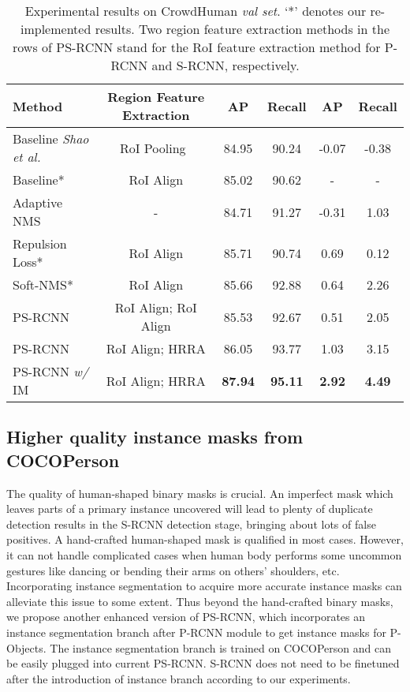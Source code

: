 \documentclass{article}
\begin{document}
\begin{table*}[!t]
\centering
\caption{
Experimental results on CrowdHuman \textit{val set}. `*' denotes our re-implemented results.
Two region feature extraction methods in the rows of PS-RCNN stand for the RoI feature extraction method for P-RCNN and S-RCNN, respectively.}
\begin{tabular}{l|c|cc|cc}
\hline
Method         & Region Feature Extraction & AP    & Recall &  AP &  Recall \\ \hline
Baseline \emph{Shao et al.~\cite{CrowdHuman}}         &           RoI Pooling~\cite{Ren2017Faster}  &   84.95    & 90.24       &  -0.07  &  -0.38      \\
Baseline*      &           RoI Align               &    85.02   &  90.62      &  -  & -       \\
Adaptive NMS~\cite{Liu2019Adaptive}   &            -               & 84.71 & 91.27  &  -0.31   & 1.03    \\
Repulsion Loss*~\cite{Repulsionloss}  &           RoI Align               &   85.71    &  90.74      & 0.69   & 0.12       \\
Soft-NMS*~\cite{softnms}  &           RoI Align               &   85.66    &  92.88      & 0.64   & 2.26       \\ \hline
PS-RCNN        &           RoI Align; RoI Align                &  85.53     &  92.67      & 0.51   & 2.05       \\
PS-RCNN        &           RoI Align; HRRA          &  86.05     &  93.77      & 1.03   & 3.15       \\
PS-RCNN \textit{w/} IM   &           RoI Align; HRRA               &   \textbf{87.94}    &   \textbf{95.11}   &  \textbf{2.92}   & \textbf{4.49}      
\end{tabular}\label{mainresults}
\vspace{-0.4cm}
\end{table*}


\subsection{Higher quality instance masks from COCOPerson}

The quality of human-shaped binary masks is crucial. An imperfect mask which leaves parts of a primary instance uncovered will lead to plenty of duplicate detection results in the S-RCNN detection stage, bringing about lots of false positives. A hand-crafted human-shaped mask is qualified in most cases. However, it can not handle complicated cases when human body performs some uncommon gestures like dancing or bending their arms on others' shoulders, etc. Incorporating instance segmentation to acquire more accurate instance masks can alleviate this issue to some extent. Thus beyond the hand-crafted binary masks, we propose another enhanced version of PS-RCNN, which incorporates an instance segmentation branch after P-RCNN module to get instance masks for P-Objects. The instance segmentation branch is trained on COCOPerson and can be easily plugged into current PS-RCNN. S-RCNN does not need to be finetuned after the introduction of instance branch according to our experiments. 
\end{document}
